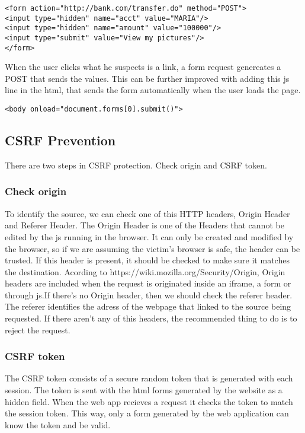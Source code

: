 \begin{verbatim}
<form action="http://bank.com/transfer.do" method="POST">
<input type="hidden" name="acct" value="MARIA"/>
<input type="hidden" name="amount" value="100000"/>
<input type="submit" value="View my pictures"/>
</form>
\end{verbatim}
When the user clicks what he suspects is a link, a form request genereates a POST that sends the values. This can be further improved with adding this js line in the html, that sends the form automatically when the user loads the page.

\begin{verbatim}
<body onload="document.forms[0].submit()">
\end{verbatim}

\subsection{CSRF Prevention}
There are two steps in CSRF protection. Check origin and CSRF token.
\subsubsection{Check origin}
To identify the source, we can check one of this HTTP headers, Origin Header and Referer Header.
The Origin Header is one of the Headers that cannot be edited by the js running in the browser. It can only be created and modified by the browser, so if we are assuming the victim's browser is safe, the header can be trusted. If this header is present, it should be checked to make sure it matches the destination. Acording to https://wiki.mozilla.org/Security/Origin, Origin headers are included when the request is originated inside an iframe, a form or through js.If there's no Origin header, then we should check the referer header. The referer identifies the adress of the webpage that linked to the source being requested. If there aren't any of this headers, the recommended thing to do is to reject the request.
\subsubsection{CSRF token}
The CSRF token consists of a secure random token that is generated with each session. The token is sent with the html forms generated by the website as a hidden field. When the web app recieves a request it checks the token to match the session token. This way, only a form generated by the web application can know the token and be valid.

